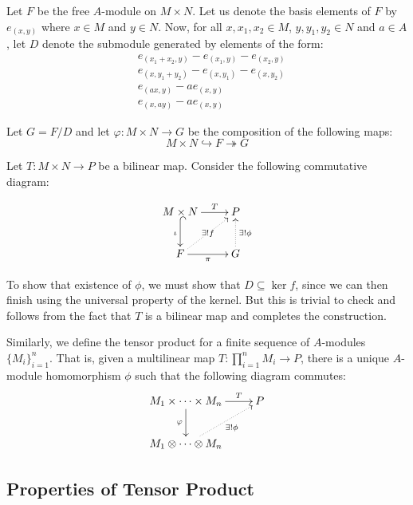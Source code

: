 Let $F$ be the free $A$-module on $M\times N$. Let us denote the basis elements of $F$ by $e_{(x,y)}$ where $x\in M$ and $y\in N$. Now, for all $x,x_1,x_2\in M$, $y,y_1,y_2\in N$ and $a\in A$, let $D$ denote the submodule generated by elements of the form: 
\begin{align*}
    &e_{(x_1 + x_2, y)} - e_{(x_1,y)} - e_{(x_2,y)}\\
    &e_{(x,y_1 + y_2)} - e_{(x,y_1)} - e_{(x,y_2)}\\
    &e_{(ax,y)} - ae_{(x,y)}\\
    &e_{(x,ay)} - ae_{(x,y)}
\end{align*}

Let $G = F/D$ and let $\varphi: M\times N\to G$ be the composition of the following maps: 
\begin{equation*}
    M\times N\hookrightarrow F\twoheadrightarrow G
\end{equation*}

Let $T: M\times N\to P$ be a bilinear map. Consider the following commutative diagram: 

\begin{equation*}
\xymatrix {
    M\times N\ar[r]^-T\ar@{^{(}->}_{\iota}[d] & P\\
    F\ar[r]_{\pi}\ar@{.>}[ru]|{\exists! f} & G\ar@{.>}[u]_{\exists!\phi}
}
\end{equation*}

To show that existence of $\phi$, we must show that $D\subseteq\ker f$, since we can then finish using the universal property of the kernel. But this is trivial to check and follows from the fact that $T$ is a bilinear map and completes the construction.

\begin{mdframed}
    Similarly, we define the tensor product for a finite sequence of $A$-modules $\{M_i\}_{i = 1}^n$. That is, given a multilinear map $T:\prod\limits_{i = 1}^n M_i\to P$, there is a unique $A$-module homomorphism $\phi$ such that the following diagram commutes: 
    \begin{equation*}
    \xymatrix{
        M_1\times\cdots\times M_n\ar[r]^-T\ar[d]_\varphi & P\\
        M_1\otimes\cdots\otimes M_n\ar@{.>}[ru]_-{\exists!\phi}
    }
    \end{equation*}
\end{mdframed}

\subsection*{Properties of Tensor Product}

